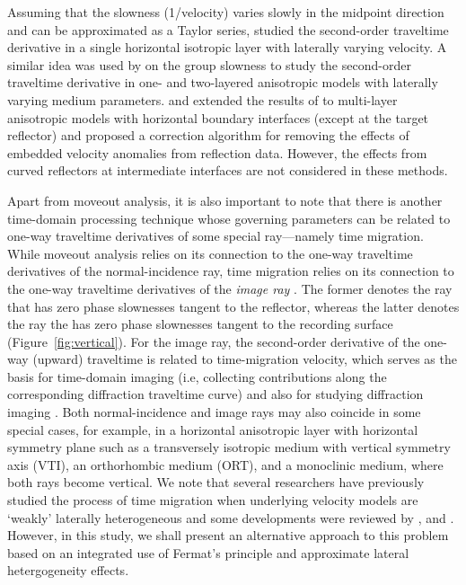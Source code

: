 Assuming that the slowness (1/velocity) varies slowly in the midpoint direction and can be approximated as a Taylor series, \cite{lynnclaerbout} studied the second-order traveltime derivative in a single horizontal isotropic layer with laterally varying velocity. A similar idea was used by \cite{grechkatsvankinlatvar} on the group slowness to study the second-order traveltime derivative in one- and two-layered anisotropic models with laterally varying medium parameters. \cite{takanashitsvankin11} and \cite{takanashitsvankin12} extended the results of \cite{grechkatsvankinlatvar} to multi-layer anisotropic models with horizontal boundary interfaces (except at the target reflector) and proposed a correction algorithm for removing the effects of embedded velocity anomalies from reflection data. However, the effects from curved reflectors at intermediate interfaces are not considered in these methods.

Apart from moveout analysis, it is also important to note that there is another time-domain processing technique whose governing parameters can be related to one-way traveltime derivatives of some special ray---namely time migration. While moveout analysis relies on its connection to the one-way traveltime derivatives of the normal-incidence ray, time migration relies on its connection to the one-way traveltime derivatives of the \textit{image ray} \cite[]{hubralimageray}. The former denotes the ray that has zero phase slownesses tangent to the reflector, whereas the latter denotes the ray the has zero phase slownesses tangent to the recording surface (Figure~\ref{fig:vertical}). For the image ray, the second-order derivative of the one-way (upward) traveltime is related to time-migration velocity, which serves as the basis for time-domain imaging (i.e, collecting contributions along the corresponding diffraction traveltime curve) and also for studying diffraction imaging \cite[]{fomeldiffrac,resheflanda}. Both normal-incidence and image rays may also coincide in some special cases, for example, in a horizontal anisotropic layer with horizontal symmetry plane such as a transversely isotropic medium with vertical symmetry axis (VTI), an orthorhombic medium (ORT), and a monoclinic medium, where both rays become vertical. We note that several researchers have previously studied the process of time migration when underlying velocity models are ‘weakly’ laterally heterogeneous and some developments were reviewed by \cite{cam}, \cite{schleicher} and \cite{iversen}. However, in this study, we shall present an alternative approach to this problem based on an integrated use of Fermat’s principle and approximate lateral hetergogeneity effects.


